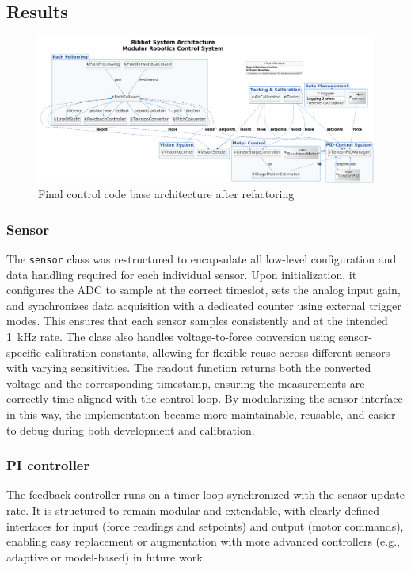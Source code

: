 \subsection{Results}

\begin{figure}
	\centering
	\includegraphics[width=\linewidth]{images/Software documentation/architecture3.png}
	\caption{Final control code base architecture after refactoring}
	\label{fig:architecture}
\end{figure}






\subsubsection{Sensor}
The \texttt{sensor} class was restructured to encapsulate all low-level configuration and data handling required for each individual sensor. Upon initialization, it configures the ADC to sample at the correct timeslot, sets the analog input gain, and synchronizes data acquisition with a dedicated counter using external trigger modes. This ensures that each sensor samples consistently and at the intended \SI{1}{\kilo\hertz} rate. The class also handles voltage-to-force conversion using sensor-specific calibration constants, allowing for flexible reuse across different sensors with varying sensitivities. The readout function returns both the converted voltage and the corresponding timestamp, ensuring the measurements are correctly time-aligned with the control loop. By modularizing the sensor interface in this way, the implementation became more maintainable, reusable, and easier to debug during both development and calibration.

\subsubsection{PI controller}
The feedback controller runs on a timer loop synchronized with the sensor update rate. It is structured to remain modular and extendable, with clearly defined interfaces for input (force readings and setpoints) and output (motor commands), enabling easy replacement or augmentation with more advanced controllers (e.g., adaptive or model-based) in future work.

